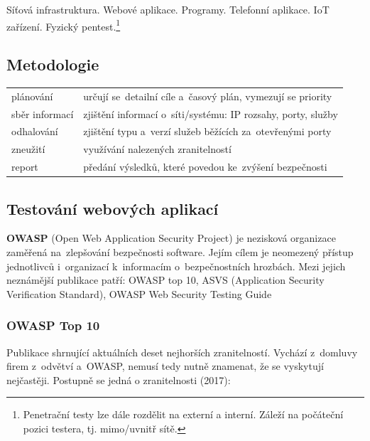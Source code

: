 Síťová infrastruktura. Webové aplikace. Programy. Telefonní aplikace. IoT zařízení. Fyzický pentest.\footnote{Penetrační testy lze dále rozdělit na externí a interní. Záleží na počáteční pozici testera, tj. mimo/uvnitř sítě.} 

\subsection{Metodologie}

\begin{table}[h]
\centering
\begin{tabular}{p{3cm}|p{12cm}}
plánování      & určují se~detailní cíle a~časový plán, vymezují se priority \\
sběr informací & zjištění informací o~síti/systému: IP rozsahy, porty, služby \\
odhalování     & zjištění typu a~verzí služeb běžících za~otevřenými porty \\
zneužití       & využívání nalezených zranitelností \\
report         & předání výsledků, které povedou ke~zvýšení bezpečnosti \\
\end{tabular}
\end{table}

\subsection{Testování webových aplikací}

\textbf{OWASP} (Open Web Application Security Project) je nezisková organizace zaměřená na~zlepšování bezpečnosti software. Jejím cílem je neomezený přístup jednotlivců i~organizací k~informacím o~bezpečnostních hrozbách. Mezi jejich neznámější publikace patří: OWASP top 10, ASVS (Application Security Verification Standard), OWASP Web Security Testing Guide

\subsubsection{OWASP Top 10}

Publikace shrnující aktuálních deset nejhorších zranitelností. Vychází z~domluvy firem z~odvětví a~OWASP, nemusí tedy nutně znamenat, že se vyskytují nejčastěji. Postupně se jedná o zranitelnosti (2017):

